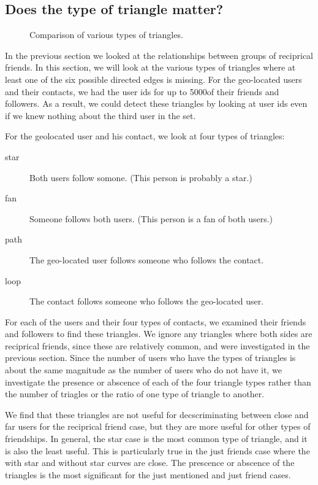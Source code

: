\documentclass{sig-alternate}
\begin{document}
\subsection{Does the type of triangle matter?}
\begin{figure*}
\centering
{}
\caption{
Comparison of various types of triangles.
}
\label{fig:TriadTypes}
\end{figure*}
In the previous section we looked at the relationships between groups of reciprical friends.
In this section, we will look at the various types of triangles where at least one of the six possible directed edges is missing.
For the geo-located users and their contacts, we had the user ids for up to 5000of their friends and followers. As a result, we could detect these triangles by looking at user ids even if we knew nothing about the third user in the set.

For the geolocated user and his contact, we look at four types of triangles:
\begin{description}
\item[star] Both users follow somone. (This person is probably a star.)
\item[fan] Someone follows both users. (This person is a fan of both users.)
\item[path] The geo-located user follows someone who follows the contact.
\item[loop] The contact follows someone who follows the geo-located user.
\end{description}

For each of the users and their four types of contacts, we examined their
friends and followers to find these triangles.
We ignore any triangles where both sides are reciprical friends, since these are relatively common, and were investigated in the previous section.
Since the number of users who have the types of triangles is about the same magnitude as the number of users who do not have it, we investigate the presence or abscence of each of the four triangle types rather than the number of triagles or the ratio of one type of triangle to another.

We find that these triangles are not useful for decscriminating between close and far users for the reciprical friend case, but they are more useful for other types of friendships.
In general, the star case is the most common type of triangle, and it is also the least useful. This is particularly true in the just friends case where the with star and without star curves are close.
The prescence or abscence of the triangles is the most significant for the just mentioned and just friend cases.
\end{document}
